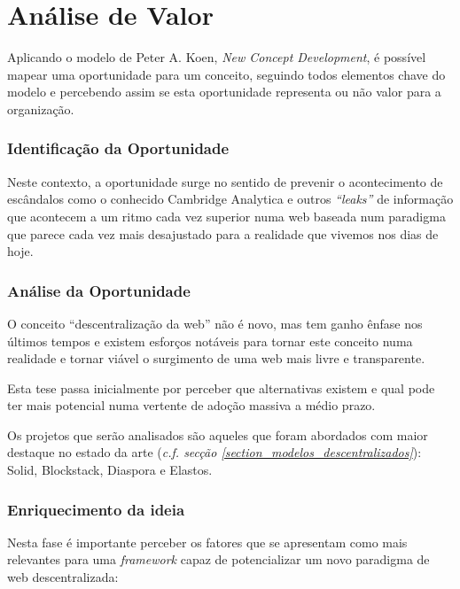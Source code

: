 \chapter{Análise de Valor}
\label{cap:3}

Aplicando o modelo de Peter A. Koen, \emph{New Concept Development}, é possível mapear uma oportunidade para um conceito, seguindo todos elementos chave do modelo e percebendo assim
se esta oportunidade representa ou não valor para a organização.

\subsection{Identificação da Oportunidade}
Neste contexto, a oportunidade surge no sentido de prevenir o acontecimento de escândalos como o conhecido Cambridge Analytica e outros \emph{“leaks”} \cite{cambridge_analytica} de informação que acontecem a um ritmo cada vez superior numa web baseada num paradigma que parece cada vez mais desajustado para a realidade que vivemos nos dias de hoje.

\subsection{Análise da Oportunidade}
O conceito “descentralização da web” não é novo, mas tem ganho ênfase nos últimos tempos e existem esforços notáveis para tornar este conceito numa realidade e tornar viável o surgimento de uma web mais livre e transparente.

Esta tese passa inicialmente por perceber que alternativas existem e qual pode ter mais potencial numa vertente de adoção massiva a médio prazo.

Os projetos que serão analisados são aqueles que foram abordados com maior destaque no estado da arte (\emph{c.f. secção \ref{section_modelos_descentralizados}}): Solid, Blockstack, Diaspora e Elastos.

\subsection{Enriquecimento da ideia}
Nesta fase é importante perceber os fatores que se apresentam como mais relevantes para uma \emph{framework} capaz de potencializar um novo paradigma de web descentralizada:

